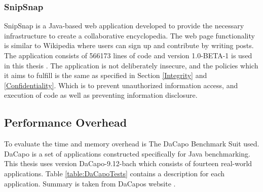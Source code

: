 \subsubsection{SnipSnap}
SnipSnap is a Java-based web application developed to provide the necessary infrastructure to create a collaborative encyclopedia. The web page functionality is similar to Wikipedia \parencite{wikipedia} where users can sign up and contribute by writing posts. The application consists of 566173 lines of code and version 1.0-BETA-1 is used in this thesis \parencite{snipsnap}. The application is not deliberately insecure, and the policies which it aims to fulfill is the same as specified in Section \ref{Integrity} and \ref{Confidentiality}. Which is to prevent unauthorized information access, and execution of code as well as preventing information disclosure.



\subsection{Performance Overhead}
To evaluate the time and memory overhead is The DaCapo Benchmark Suit \parencite{dacapo} used. DaCapo is a set of applications constructed specifically for Java benchmarking. This thesis uses version DaCapo-9.12-bach which consists of fourteen real-world applications. Table \ref{table:DaCapoTests} contains a description for each application. Summary is taken from DaCapos website \parencite{dacapoBench}.

